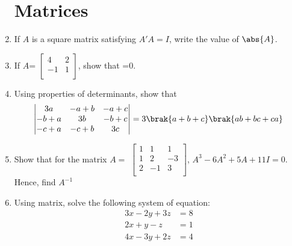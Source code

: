 \begin{enumerate}
\section*{Matrices}

\item If $A$ is a square matrix satisfying $A'A=I$, write the value of $\abs{A}$.
\item If $A$= 
$\begin{bmatrix}
  4 & 2 \\
  -1 & 1 \\
\end{bmatrix}$, show that =0.

\item Using properties of determinants, show that
\[\begin{vmatrix}
3a      &     -a+b  &    -a+c\\
-b+a    &      3b   &    -b+c\\ 
-c+a    &     -c+b  &     3c 
\end{vmatrix}= 3\brak{a+b+c}\brak{ab+bc+ca}\]

\item Show that for the matrix $A=$ 
$\begin{bmatrix}
  1 & 1 &  1 \\
  1 & 2 & -3 \\
  2 & -1 & 3 \\
\end{bmatrix}$,
${A}^3 - 6{A}^2 + 5{A} +11 I = 0$.
Hence, find ${A}^{-1}$

\item  Using matrix, solve the following system of equation: 
\begin{align*}
  3x - 2y + 3z &= 8\\
  2x + y - z &= 1\\
  4x - 3y + 2z &= 4\\
\end{align*}
\end{enumerate}